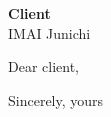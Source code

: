 \documentclass[addressstd,a4paper,10pt]{dinbrief}
\begin{document}
\begin{letter}{\textbf{Client}\\ %
               IMAI Junichi\\}%



\subject{\bf Recommendation for financial product}

\opening{Dear client,}



\closing{Sincerely, yours}



\end{letter}


\end{document}
